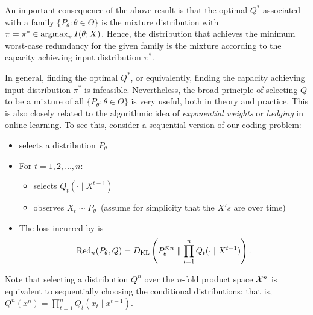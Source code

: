 \documentclass[12pt]{article}
\begin{document}
\begin{remark}
    \label{remark:caid} An important consequence of the above result is that the optimal $Q^*$ associated with a family $\{P_\theta: \theta \in \Theta\}$ is the mixture distribution with $\pi = \pi^* \in \operatorname*{argmax}_{\pi} I(\theta; X)$. Hence, the distribution that achieves the minimum worst-case redundancy for the given family is the mixture according to the capacity achieving input distribution $\pi^*$. 
\end{remark}
% 
In general, finding the optimal $Q^*$, or equivalently, finding the capacity achieving input distribution $\pi^*$ is infeasible. Nevertheless, the broad principle of selecting $Q$ to be a mixture of all $\{P_\theta: \theta \in \Theta\}$ is very useful, both in theory and practice. This is also closely related to the algorithmic idea of \emph{exponential weights} or \emph{hedging} in online learning. To see this, consider a sequential version of our coding problem: 
\begin{itemize}
    \item \nature selects a distribution $P_\theta$
    \item For $t=1, 2, \ldots, n$: 
        \begin{itemize}
            \item \coder selects $Q_t(\cdot \mid X^{t-1})$
            \item \coder observes $X_t \sim P_\theta$~(assume for simplicity that the $X's$ are \iid over time)
        \end{itemize}
        \item The loss incurred by \coder is 
        \begin{align}
            \mathrm{Red}_n(P_\theta, Q) = D_{\text{KL}}\left( P_\theta^{\otimes n} \parallel \prod_{t=1}^n Q_t(\cdot \mid X^{t-1}) \right). 
        \end{align}
\end{itemize}
Note that selecting a distribution $Q^n$ over the $n$-fold product space ${\cal X}^n$ is equivalent to sequentially choosing the conditional distributions: that is, $Q^n(x^n) = \prod_{t=1}^n Q_t(x_t \mid x^{t-1})$.
\end{document}
